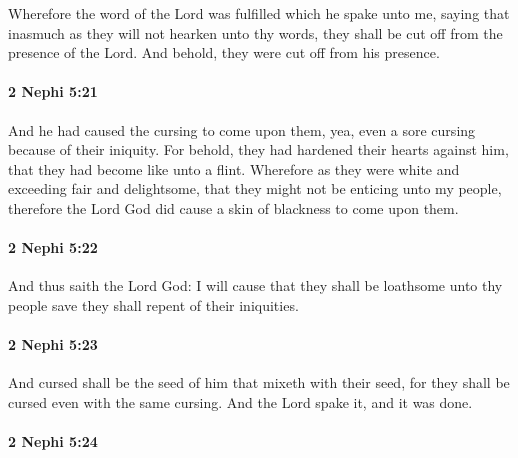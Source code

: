 			Wherefore the word of the Lord was fulfilled
			which he spake unto me,
			saying that inasmuch as they will not hearken unto thy words,
			they shall be cut off from the presence of the Lord.
			And behold, they were cut off from his presence.

		\paragraph{2 Nephi 5:21} %
			\label{2NEPHI-5-21}

			And he had caused the cursing to come upon them,
			yea, even a sore cursing because of their iniquity.
			For behold, they had hardened their hearts against him,
			that they had become like unto a flint.
			Wherefore as they were white and exceeding fair and delightsome,
			that they might not be enticing unto my people,
			therefore the Lord God did cause a skin of blackness to come upon them.

		\paragraph{2 Nephi 5:22} %
			\label{2NEPHI-5-22}

			And thus saith the Lord God:
			I will cause that they shall be loathsome unto thy people
			save they shall repent of their iniquities.

		\paragraph{2 Nephi 5:23} %
			\label{2NEPHI-5-23}

			And cursed shall be the seed of him that mixeth with their seed,
			for they shall be cursed even with the same cursing.
			And the Lord spake it, and it was done.

		\paragraph{2 Nephi 5:24} %
			\label{2NEPHI-5-24}

